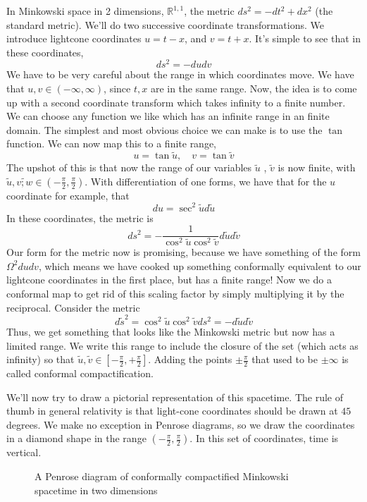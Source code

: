 In Minkowski space in 2 dimensions, $ \mathbb{ R} ^{ 1, 1 } $, 
the metric $ ds ^ 2 = - d t ^ 2 + dx ^ 2 $ (the standard metric). 
We'll do two successive coordinate transformations. 
We introduce lightcone coordinates  $ u  = t  -x $, 
and $ v = t + x $. It's simple to see that 
in these coordinates, 
\[
 ds ^ 2 =  - du dv
\] We have to be very careful about the range in which coordinates move. 
We have that $ u , v \in ( - \infty  , \infty ) $, 
since $ t , x  $  are in the same range. 
Now, the idea is to come up with a second coordinate transform which 
takes infinity to a finite number. We can choose any function we 
like which has an infinite range in an finite domain. 
The simplest and most obvious choice we 
can make is to use the $ \tan $ function. 
We can now map this to a finite range, 
\[
 u = \tan \tilde{ u } , \quad v = \tan \tilde{ v }   
\] The upshot of this 
is that now the 
range of our variables $  \tilde{u }  $ , $ \tilde{ v }  $
is now finite, with $ \tilde{u}   , \tilde{v;w}  \in ( - \frac{ \pi }{ 2 } , \frac{\pi}{ 2 } ) $. 
With differentiation of one forms, we have that for the $ u $ 
coordinate for example, that 
\[
 du = \sec ^2 \tilde{ u } d  \tilde{ u }  
\] 
In these coordinates, the metric is 
\[
 ds ^  2 =  -\frac{1}{\cos ^ 2 \tilde{ u } \cos ^ 2 \tilde{ v}   } d \tilde{ u } d \tilde{ v }   
\] Our form for the metric now is promising, 
because we have something of the form $ \Omega^ 2 du dv $, 
which means we have cooked up something conformally equivalent to 
our lightcone coordinates in the first place, but has 
a finite range!
Now we do a conformal map to get rid of this scaling factor 
by simply multiplying it by the reciprocal. 
Consider the metric 
\[
 d \tilde{ s } ^ 2 = \cos ^ 2 \tilde{ u } \cos ^ 2 \tilde{v } ds ^ 2  = - d \tilde{ u } d \tilde{ v }      
\] Thus, 
we get something that looks like 
the Minkowski metric but now has a limited range. 
We write this range to include the closure of the set (which acts as infinity) 
so that $ \tilde{ u } , \tilde{ v } \in [ - \frac{\pi}{2 } , + \frac{\pi}{2 } ]   $. 
Adding the points $ \pm \frac{\pi}{ 2 } $ that used to be 
$ \pm \infty$ is called conformal compactification.

We'll now try to draw a pictorial 
representation of this spacetime. 
The rule of thumb in general relativity is that light-cone 
coordinates should be drawn at $ 45 $ degrees. 
We make no exception in Penrose diagrams, so we 
draw the coordinates in a diamond shape in the range $ ( - \frac{\pi}{2 } , \frac{\pi}{2 } ) $. 
In this set of coordinates, time is vertical. 
\begin{figure}[h]
	\centering
	
	\caption{A Penrose diagram of conformally compactified 
	Minkowski spacetime in two dimensions}%
	\label{fig:}
\end{figure}


